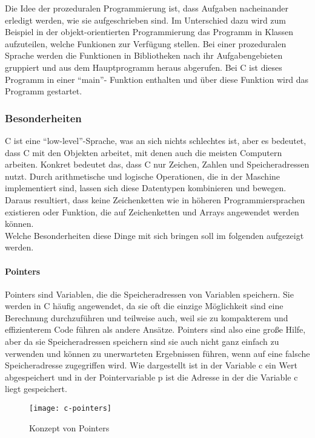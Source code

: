  Die Idee der prozeduralen Programmierung ist, dass Aufgaben nacheinander erledigt werden, wie
  sie aufgeschrieben sind. Im Unterschied dazu wird zum Beispiel in der objekt-orientierten
  Programmierung das Programm in Klassen aufzuteilen, welche Funkionen zur Verfügung stellen. Bei
  einer prozeduralen Sprache werden die Funktionen in Bibliotheken nach ihr Aufgabengebieten
  gruppiert und aus dem Hauptprogramm heraus abgerufen. Bei C ist dieses Programm in einer ``main''-
  Funktion enthalten und über diese Funktion wird das Programm gestartet.

 \subsubsection{Besonderheiten}
 C ist eine ``low-level''-Sprache, was an sich nichts schlechtes ist, aber es bedeutet, dass C mit den
 Objekten arbeitet, mit denen auch die meisten Computern arbeiten. Konkret bedeutet das, dass
 C nur Zeichen, Zahlen und Speicheradressen nutzt. Durch arithmetische und logische Operationen,
 die in der Maschine implementiert sind, lassen sich diese Datentypen kombinieren und bewegen.
 Daraus resultiert, dass keine Zeichenketten wie in höheren Programmiersprachen existieren oder
 Funktion, die auf Zeichenketten und Arrays angewendet werden können. \cite{kernighan88} \\
 Welche Besonderheiten diese Dinge mit sich bringen soll im folgenden aufgezeigt werden.

 \paragraph{Pointers}
  Pointers sind Variablen, die die Speicheradressen von Variablen speichern. Sie werden in C häufig
  angewendet, da sie oft die einzige Möglichkeit sind eine Berechnung durchzuführen und teilweise
  auch, weil sie zu kompakterem und effizienterem Code führen als andere Ansätze. \cite{kernighan88}
  Pointers sind also eine große Hilfe, aber da sie Speicheradressen speichern sind sie auch nicht ganz
  einfach zu verwenden und können zu unerwarteten Ergebnissen führen, wenn auf eine falsche
  Speicheradresse zugegriffen wird. Wie  dargestellt ist in der Variable c ein
  Wert abgespeichert  und in der Pointervariable p ist die Adresse in der die Variable c liegt gespeichert.
  
  \begin{figure}[h!]
   \begin{center}
    \texttt{[image: c-pointers]}
   \end{center}
   \caption[Konzept von Pointers in C]{Konzept von Pointers \cite{kernighan88}}
   \label{fig:c-pointers}
  \end{figure}
  
